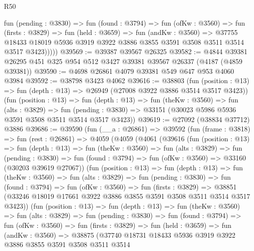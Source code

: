 \begin{lexlean}{R50}
\begin{coremodule}
            fun (pending : @3830) =>
            fun (found : @3794) =>
            fun (ofKw : @3560) =>
            fun (firsts : @3829) =>
            fun (held : @3659) =>
            fun (andKw : @3560) =>
            @37755
              @18433
              @18019
              @5936
              @3919
              @3922
              @3886
              @3855
              @3591
              @3508
              @3511
              @3514
              @3517
              @3423)))))
@39569 := @39387 @39567 @26325
@39582 := @4844 @39381 @26295 @451 @325 @954 @512 @3427 @39381 @39567 @26337 (@4187 (@4859 @39381))
@39590 := @4698 @26861 @4079 @39381 @549 @647 @953 @4060 @3984
@39592 := @38798 @3423 @4062
@39616 := @38803
    (fun (position : @13) => fun (depth : @13) => @26949 (@27008 @3922 @3886 @3514 @3517 @3423))
    (fun (position : @13) =>
    fun (depth : @13) =>
    fun (theKw : @3560) =>
    fun (alts : @3829) =>
    fun (pending : @3830) => @33151 (@30023 @5986 @5936 @3591 @3508 @3511 @3514 @3517 @3423))
@39619 := @27092 (@38834 @37712) @3886
@39686 := @39590
    (fun (__a : @26861) =>
    @39592
      (fun (frame : @3818) =>
      fun (rest : @26861) =>
      @4059
        (@4059
          (@4061
            (@39616
              (fun (position : @13) =>
              fun (depth : @13) =>
              fun (theKw : @3560) =>
              fun (alts : @3829) =>
              fun (pending : @3830) =>
              fun (found : @3794) => fun (ofKw : @3560) => @33160 (@30203 @39619 @27067))
              (fun (position : @13) =>
              fun (depth : @13) =>
              fun (theKw : @3560) =>
              fun (alts : @3829) =>
              fun (pending : @3830) =>
              fun (found : @3794) =>
              fun (ofKw : @3560) =>
              fun (firsts : @3829) =>
              @38851 (@33246 @18019 @17661 @3922 @3886 @3855 @3591 @3508 @3511 @3514 @3517 @3423))
              (fun (position : @13) =>
              fun (depth : @13) =>
              fun (theKw : @3560) =>
              fun (alts : @3829) =>
              fun (pending : @3830) =>
              fun (found : @3794) =>
              fun (ofKw : @3560) =>
              fun (firsts : @3829) =>
              fun (held : @3659) =>
              fun (andKw : @3560) =>
              @38875
                (@37740
                  @18731
                  @18433
                  @5936
                  @3919
                  @3922
                  @3886
                  @3855
                  @3591
                  @3508
                  @3511
                  @3514

\end{coremodule}
\end{lexlean}

